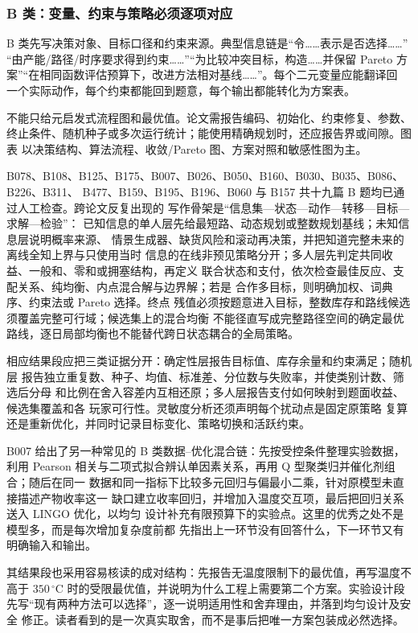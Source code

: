 \subsubsection{B 类：变量、约束与策略必须逐项对应}

B 类先写决策对象、目标口径和约束来源。典型信息链是“令……表示是否选择……”
“由产能/路径/时序要求得到约束……”“为比较冲突目标，构造……并保留 Pareto
方案”“在相同函数评估预算下，改进方法相对基线……”。每个二元变量应能翻译回
一个实际动作，每个约束都能回到题意，每个输出都能转化为方案表。

不能只给元启发式流程图和最优值。论文需报告编码、初始化、约束修复、参数、
终止条件、随机种子或多次运行统计；能使用精确规划时，还应报告界或间隙。图表
以决策结构、算法流程、收敛/Pareto 图、方案对照和敏感性图为主。

B078、B108、B125、B175、B007、B026、B050、B160、B030、B035、B086、B226、B311、
B477、B159、B195、B196、B060 与 B157 共十九篇 B 题均已通过人工检查。跨论文反复出现的
写作骨架是“信息集—状态—动作—转移—目标—求解—检验”：
已知信息的单人层先给最短路、动态规划或整数规划基线；未知信息层说明概率来源、
情景生成器、缺货风险和滚动再决策，并把知道完整未来的离线全知上界与只使用当时
信息的在线非预见策略分开；多人层先判定共同收益、一般和、零和或拥塞结构，再定义
联合状态和支付，依次检查最佳反应、支配关系、纯均衡、内点混合解与边界解；若是
合作多目标，则明确加权、词典序、约束法或 Pareto 选择。终点
残值必须按题意进入目标，整数库存和路线候选须覆盖完整可行域；候选集上的混合均衡
不能径直写成完整路径空间的确定最优路线，逐日局部均衡也不能替代跨日状态耦合的全局策略。

相应结果段应把三类证据分开：确定性层报告目标值、库存余量和约束满足；随机层
报告独立重复数、种子、均值、标准差、分位数与失败率，并使类别计数、筛选后分母
和比例在舍入容差内互相还原；多人层报告支付如何映射到题面收益、候选集覆盖和各
玩家可行性。灵敏度分析还须声明每个扰动点是固定原策略
复算还是重新优化，并同时记录目标变化、策略切换和活跃约束。

B007 给出了另一种常见的 B 类数据--优化混合链：先按受控条件整理实验数据，利用
Pearson 相关与二项式拟合辨认单因素关系，再用 Q 型聚类归并催化剂组合；随后在同一
数据和同一指标下比较多元回归与偏最小二乘，针对原模型未直接描述产物收率这一
缺口建立收率回归，并增加入温度交互项，最后把回归关系送入 LINGO 优化，以均匀
设计补充有限预算下的实验点。这里的优秀之处不是模型多，而是每次增加复杂度前都
先指出上一环节没有回答什么，下一环节又有明确输入和输出。

其结果段也采用容易核读的成对结构：先报告无温度限制下的最优值，再写温度不高于
$350\,^{\circ}\mathrm{C}$ 时的受限最优值，并说明为什么工程上需要第二个方案。实验设计段
先写“现有两种方法可以选择”，逐一说明适用性和舍弃理由，并落到均匀设计及安全
修正。读者看到的是一次真实取舍，而不是事后把唯一方案包装成必然选择。

